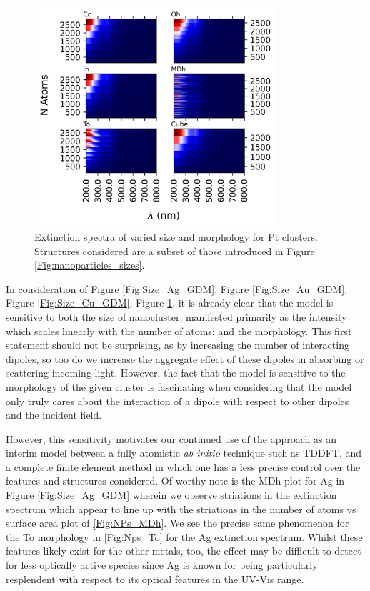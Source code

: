 \begin{figure}[b]
    \includegraphics[width=0.8\textwidth]{figures/LM/GDM/Pt_Specs.png}
    \caption{Extinction spectra of varied size and morphology for Pt clusters. Structures considered are a subset of those introduced in Figure \ref{Fig:nanoparticles_sizes}.}
    \label{Fig:Size_Pt_GDM}
\end{figure}

In consideration of Figure \ref{Fig:Size_Ag_GDM}, Figure \ref{Fig:Size_Au_GDM}, Figure \ref{Fig:Size_Cu_GDM}, Figure \ref{Fig:Size_Pt_GDM}, it is already clear that the model is sensitive to both the size of nanocluster; manifested primarily as the intensity which scales linearly with the number of atoms; and the morphology. This first statement should not be surprising, as by increasing the number of interacting dipoles, so too do we increase the aggregate effect of these dipoles in absorbing or scattering incoming light. However, the fact that the model is sensitive to the morphology of the given cluster is fascinating when considering that the model only truly cares about the interaction of a dipole with respect to other dipoles and the incident field.

However, this sensitivity motivates our continued use of the approach as an interim model between a fully atomistic \textit{ab initio} technique such as TDDFT, and a complete finite element method in which one has a less precise control over the features and structures considered. Of worthy note is the MDh plot for Ag in Figure \ref{Fig:Size_Ag_GDM} wherein we observe striations in the extinction spectrum which appear to line up with the striations in the number of atoms vs surface area plot of \ref{Fig:NPs_MDh}. We see the precise same phenomenon for the To morphology in \ref{Fig:Nps_To} for the Ag extinction spectrum. Whilst these features likely exist for the other metals, too, the effect may be difficult to detect for less optically active species since Ag is known for being particularly resplendent with respect to its optical features in the UV-Vis range.


